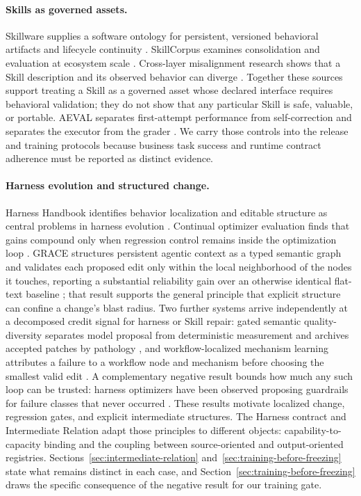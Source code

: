 \paragraph{Skills as governed assets.}
Skillware supplies a software ontology for persistent, versioned behavioral artifacts and lifecycle continuity \cite{fan2026skillware}. SkillCorpus examines consolidation and evaluation at ecosystem scale \cite{wang2026skillcorpus}. Cross-layer misalignment research shows that a Skill description and its observed behavior can diverge \cite{zhang2026misalignment}. Together these sources support treating a Skill as a governed asset whose declared interface requires behavioral validation; they do not show that any particular Skill is safe, valuable, or portable. AEVAL separates first-attempt performance from self-correction and separates the executor from the grader \cite{anand2026aeval}. We carry those controls into the release and training protocols because business task success and runtime contract adherence must be reported as distinct evidence.

\paragraph{Harness evolution and structured change.}
Harness Handbook identifies behavior localization and editable structure as central problems in harness evolution \cite{wang2026handbook}. Continual optimizer evaluation finds that gains compound only when regression control remains inside the optimization loop \cite{wang2026compound}. GRACE structures persistent agentic context as a typed semantic graph and validates each proposed edit only within the local neighborhood of the nodes it touches, reporting a substantial reliability gain over an otherwise identical flat-text baseline \cite{hsu2026grace}; that result supports the general principle that explicit structure can confine a change's blast radius. 
Two further systems arrive independently at a decomposed credit signal for harness or Skill repair: gated semantic quality-diversity separates model proposal from deterministic measurement and archives accepted patches by pathology \cite{luo2026gsme}, and workflow-localized mechanism learning attributes a failure to a workflow node and mechanism before choosing the smallest valid edit \cite{lin2026wml}. A complementary negative result bounds how much any such loop can be trusted: harness optimizers have been observed proposing guardrails for failure classes that never occurred \cite{wang2026phantom}. These results motivate localized change, regression gates, and explicit intermediate structures. The Harness contract and Intermediate Relation adapt those principles to different objects: capability-to-capacity binding and the coupling between source-oriented and output-oriented registries. Sections~\ref{sec:intermediate-relation} and~\ref{sec:training-before-freezing} state what remains distinct in each case, and Section~\ref{sec:training-before-freezing} draws the specific consequence of the negative result for our training gate.

